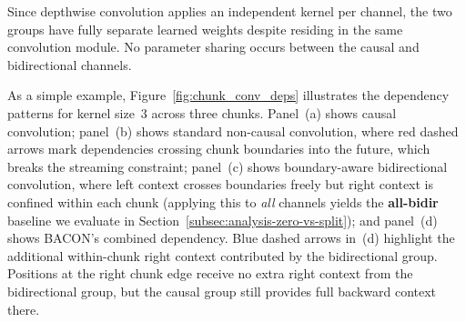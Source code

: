 \documentclass[cameraready]{Interspeech}
\begin{document}
Since depthwise convolution applies an independent kernel per channel, the two
groups have fully separate learned weights despite residing in the same
convolution module. No parameter sharing occurs between the causal and
bidirectional channels. 






As a simple example, Figure~\ref{fig:chunk_conv_deps} illustrates the dependency patterns for
kernel size~3 across three chunks. Panel~(a) shows causal convolution; panel~(b) shows standard non-causal convolution, where
red dashed arrows mark dependencies crossing chunk boundaries into the future, which breaks the streaming constraint;
panel~(c) shows boundary-aware bidirectional convolution, where left context crosses boundaries freely but right context is
confined within each chunk (applying this to \emph{all} channels yields the \textbf{all-bidir} baseline we evaluate in Section~\ref{subsec:analysis-zero-vs-split}); and panel~(d) shows BACON's combined dependency. Blue dashed arrows in~(d) highlight the additional
within-chunk right context contributed by the bidirectional group. Positions
at the right chunk edge receive no extra right context from the bidirectional
group, but the causal group still provides full backward context there.
\end{document}
